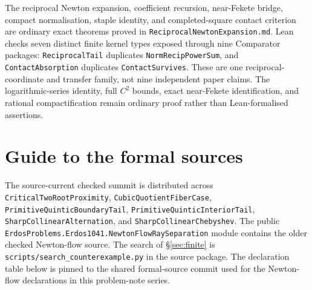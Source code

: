 \documentclass[11pt]{article}
\begin{document}
The reciprocal Newton expansion, coefficient recursion, near-Fekete bridge,
compact normalisation, staple identity, and completed-square contact criterion
are ordinary exact theorems proved in
\texttt{ReciprocalNewtonExpansion.md}.  Lean checks seven distinct finite
kernel types exposed through nine Comparator packages:
\texttt{ReciprocalTail} duplicates \texttt{NormRecipPowerSum}, and
\texttt{ContactAbsorption} duplicates \texttt{ContactSurvives}.  These are
one reciprocal-coordinate and transfer family, not nine independent paper
claims.  The logarithmic-series identity, full $C^2$ bounds, exact
near-Fekete identification, and rational compactification remain ordinary
proof rather than Lean-formalised assertions.

\appendix
\section{Guide to the formal sources}\label{app:sources}

The source-current checked summit is distributed across
\texttt{CriticalTwoRootProximity}, \texttt{CubicQuotientFiberCase},
\texttt{PrimitiveQuinticBoundaryTail},
\texttt{PrimitiveQuinticInteriorTail},
\texttt{SharpCollinearAlternation}, and
\texttt{SharpCollinearChebyshev}.  The public
\texttt{ErdosProblems.Erdos1041.NewtonFlowRaySeparation} module contains the
older checked Newton-flow source.  The search of
\S\ref{sec:finite} is
\texttt{scripts/search\_counterexample.py} in the source package.  The
declaration table below is pinned to the shared formal-source commit used for
the Newton-flow declarations in this problem-note series.
\end{document}
